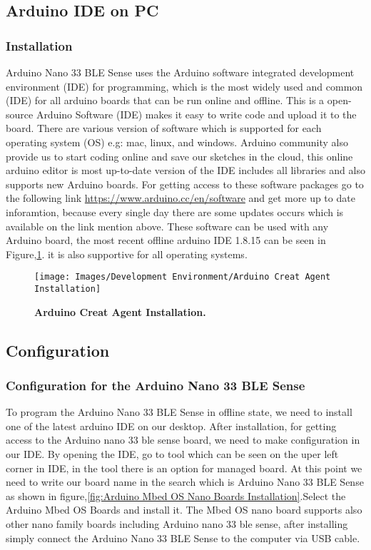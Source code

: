 \subsection{Arduino IDE on PC}
\subsubsection{Installation}
Arduino Nano 33 BLE Sense uses the Arduino software integrated development environment (IDE) for programming, which is the most widely used and common (IDE) for all arduino boards that can be run online and offline. This is a open-source Arduino Software (IDE) makes it easy to write code and upload it to the board. There are various version of software which is supported for each operating system (OS) e.g: mac, linux, and windows. Arduino community also provide us to start coding online and save our sketches in the cloud, this online arduino editor is most up-to-date version of the IDE includes all libraries and also supports new Arduino boards. For getting access to these software packages go to the following link \url{https://www.arduino.cc/en/software}  and get more up to date inforamtion, because every single day there are some updates occurs which is available on the link mention above. These software can be used with any Arduino board, the most recent offline arduino IDE 1.8.15 can be seen in Figure,\ref{fig:Arduino Creat Agent Installation}. it is also supportive for all operating systems.


\begin{figure}[H]\centering
	\texttt{[image: Images/Development Environment/Arduino Creat Agent Installation]}
	\caption{\textbf{Arduino Creat Agent Installation.}}
	\label{fig:Arduino Creat Agent Installation}		
\end{figure}

\subsection{Configuration}
\subsubsection{Configuration for the Arduino Nano 33 BLE Sense}
To program the Arduino Nano 33 BLE Sense in offline state, we need to install one
of the latest arduino IDE on our desktop. After installation, for getting access to
the Arduino nano 33 ble sense board, we need to make configuration in our IDE. By
opening the IDE, go to tool which can be seen on the uper left corner in IDE, in the
tool there is an option for managed board. At this point we need to write our board
name in the search which is Arduino Nano 33 BLE Sense as shown in figure,\ref{fig:Arduino Mbed OS Nano Boards Installation}.Select
the Arduino Mbed OS Boards and install it. The Mbed OS nano board supports also
other nano family boards including Arduino nano 33 ble sense, after installing simply
connect the Arduino Nano 33 BLE Sense to the computer via USB cable.



